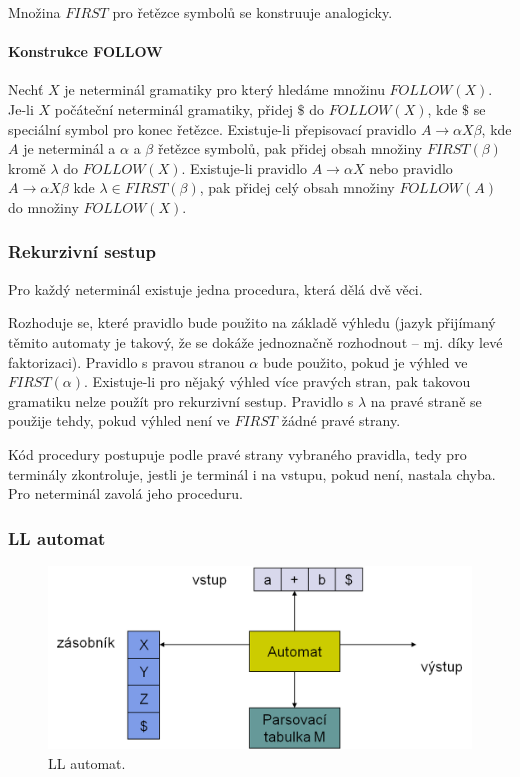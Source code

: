 Množina \(FIRST\) pro řetězce symbolů se konstruuje analogicky.

\paragraph{Konstrukce FOLLOW} Nechť \(X\) je neterminál gramatiky pro který hledáme množinu \(FOLLOW(X)\). Je-li \(X\) počáteční neterminál gramatiky, přidej \(\$\) do \(FOLLOW(X)\), kde \(\$\) se speciální symbol pro konec řetězce. Existuje-li přepisovací pravidlo \(A \to \alpha X \beta\), kde \(A\) je neterminál a \(\alpha\) a \(\beta\) řetězce symbolů, pak přidej obsah množiny \(FIRST(\beta)\) kromě \(\lambda\) do \(FOLLOW(X)\). Existuje-li pravidlo \(A \to \alpha X\) nebo pravidlo \(A \to \alpha X \beta\) kde \(\lambda \in FIRST(\beta)\), pak přidej celý obsah množiny \(FOLLOW(A)\) do množiny \(FOLLOW(X)\).


\subsubsection{Rekurzivní sestup}

Pro každý neterminál existuje jedna procedura, která dělá dvě věci.
\begin{penumerate}
	\item Rozhoduje se, které pravidlo bude použito na základě výhledu (jazyk přijímaný těmito automaty je takový, že se dokáže jednoznačně rozhodnout -- mj. díky levé faktorizaci). Pravidlo s pravou stranou \(\alpha\) bude použito, pokud je výhled ve \(FIRST(\alpha)\). Existuje-li pro nějaký výhled více pravých stran, pak takovou gramatiku nelze použít pro rekurzivní sestup. Pravidlo s \(\lambda\) na pravé straně se použije tehdy, pokud výhled není ve \(FIRST\) žádné pravé strany.
	\item Kód procedury postupuje podle pravé strany vybraného pravidla, tedy pro terminály zkontroluje, jestli je terminál i na vstupu, pokud není, nastala chyba. Pro neterminál zavolá jeho proceduru.
\end{penumerate}


\subsubsection{LL automat}

\begin{figure}[h]
	\centering
	\includegraphics[width=13cm]{i2/softwarove_inzenyrstvi/obrazky/LL_automat.png}
	\caption{LL automat.}
	\label{pic:LL_automat}
\end{figure}


